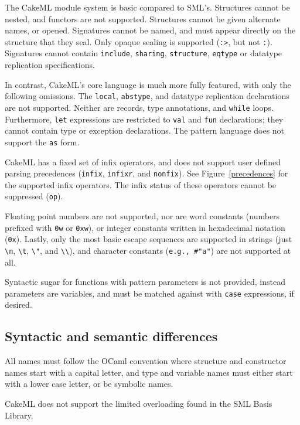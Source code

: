 \documentclass[12pt,a4paper]{book}
\begin{document}
The CakeML module system is basic compared to SML's. Structures cannot be nested, and functors are not supported. Structures cannot be given alternate names, or opened. Signatures cannot be named, and must appear directly on the structure that they seal. Only opaque sealing is supported (\texttt{:>}, but not \texttt{:}). Signatures cannot contain \texttt{include}, \texttt{sharing}, \texttt{structure}, \texttt{eqtype} or datatype replication specifications.

In contrast, CakeML's core language is much more fully featured, with only the following omissions. The \texttt{local}, \texttt{abstype}, and datatype replication declarations are not supported. Neither are records, type annotations, and \texttt{while} loops. Furthermore, \texttt{let} expressions are restricted to \texttt{val} and \texttt{fun} declarations; they cannot contain type or exception declarations. The pattern language does not support the \texttt{as} form.

CakeML has a fixed set of infix operators, and does not support user defined parsing precedences (\texttt{infix}, \texttt{infixr}, and \texttt{nonfix}). See Figure~\ref{precedences} for the supported infix operators. The infix status of these operators cannot be suppressed (\texttt{op}).

Floating point numbers are not supported, nor are word constants (numbers prefixed with \texttt{0w} or \texttt{0xw}), or integer constants written in hexadecimal notation (\texttt{0x}). Lastly, only the most basic escape sequences are supported in strings (just \texttt{\textbackslash n}, \texttt{\textbackslash t}, \texttt{\textbackslash "}, and \texttt{\textbackslash\textbackslash}), and character constants (\texttt{e.g., \#"a"}) are not supported at all.

Syntactic sugar for functions with pattern parameters is not provided, instead parameters are variables, and must be matched against with \texttt{case} expressions, if desired.

\subsection{Syntactic and semantic differences}

All names must follow the OCaml convention where structure and constructor names start with a capital letter, and type and variable names must either start with a lower case letter, or be symbolic names.

CakeML does not support the limited overloading found in the SML Basis Library.
\end{document}
